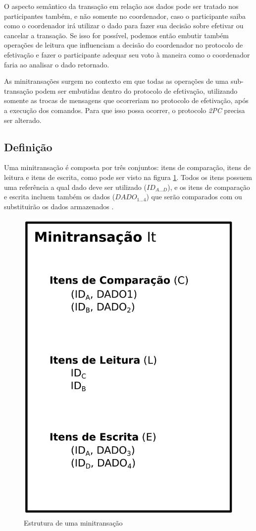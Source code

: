 \documentclass[11pt,twoside,a4paper]{book}
\begin{document}
O aspecto semântico da transação em relação aos dados pode ser tratado nos participantes também, e não somente no coordenador, caso o participante saiba como o coordenador irá utilizar o dado para fazer sua decisão sobre efetivar ou cancelar a transação. Se isso for possível, podemos então embutir também operações de leitura que influenciam a decisão do coordenador no protocolo de efetivação e fazer o participante adequar seu voto à maneira como o coordenador faria ao analisar o dado retornado.

As minitransações surgem no contexto em que todas as operações de uma sub-transação podem ser embutidas dentro do protocolo de efetivação, utilizando somente as trocas de mensagens que ocorreriam no protocolo de efetivação, após a execução dos comandos. Para que isso possa ocorrer, o protocolo \emph{2PC} precisa ser alterado.

\subsection{Definição}
\label{subsec:estrutura-minitransacoes}
Uma minitransação é composta por três conjuntos: itens de comparação, itens de leitura e itens de escrita, como pode ser visto na figura \ref{fig:estrutura_minitransacao}. Todos os itens possuem uma referência a qual dado deve ser utilizado ($ID_{A...D}$), e os itens de comparação e escrita incluem também os dados ($DADO_{1...4}$) que serão comparados com ou substituirão os dados armazenados \cite{sinfonia}. 

\begin{figure}
  \centering
  \includegraphics[width=.40\textwidth]{estrutura_minitransacao} 
  \caption{Estrutura de uma minitransação}
  \label{fig:estrutura_minitransacao} 
\end{figure}
\end{document}
